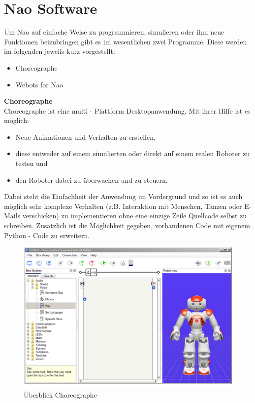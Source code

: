 \section{Nao Software}
Um Nao auf einfache Weise zu programmieren, simulieren oder ihm neue Funktionen beizubringen gibt es im wesentlichen zwei Programme. Diese werden im folgenden jeweils kurz vorgestellt:

\begin{itemize}
\item Choreographe
\item Webots for Nao
\end{itemize}


\noindent
\textbf{Choreographe} 
\\
Choreographe ist eine multi - Plattform Desktopanwendung. Mit ihrer Hilfe ist es möglich:
\begin{itemize}
\item Neue Animationen und Verhalten zu erstellen,
\item diese entweder auf einem simulierten  oder direkt auf einem realen Roboter zu testen und
\item den Roboter dabei zu überwachen und zu steuern.
\end{itemize}
Dabei steht die Einfachheit der Anwendung im Vordergrund und so ist es auch möglich sehr komplexe Verhalten (z.B. Interaktion mit Menschen, Tanzen oder E-Mails verschicken) zu implementieren ohne eine einzige Zeile Quellcode selbst zu schreiben. Zusätzlich ist die Möglichkeit gegeben, vorhandenen Code mit eigenem Python - Code zu erweitern.

\begin{figure}[H]						
	\centering							
	\includegraphics[scale=1.0]{Bilder/choreographe.png}			
	\caption{Überblick Choreographe}						
	\label{f:nao_choreographe}						
\end{figure}

